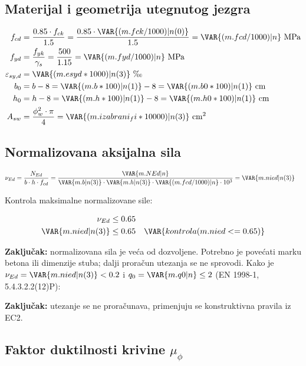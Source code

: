 \subsection{Materijal i geometrija utegnutog jezgra}

\begin{align*}
f_{cd} &= \frac{0.85 \cdot f_{ck}}{1.5} = \frac{0.85 \cdot \VAR{(m.fck/1000)|n(0)}}{1.5} = \VAR{(m.fcd/1000)|n} \ \mathrm{MPa} \\
f_{yd} &= \frac{f_{yk}}{\gamma_s} = \frac{500}{1.15} = \VAR{(m.fyd/1000)|n} \ \mathrm{MPa} \\
\varepsilon_{sy,d} &= \VAR{(m.esyd*1000)|n(3)} \ \text{‰} \\
b_0 &= b - 8 = \VAR{(m.b*100)|n(1)} - 8 = \VAR{(m.b0*100)|n(1)} \ \mathrm{cm} \\
h_0 &= h - 8 = \VAR{(m.h*100)|n(1)} - 8 = \VAR{(m.h0*100)|n(1)} \ \mathrm{cm} \\
A_{sw} &= \frac{\phi_w^2 \cdot \pi}{4} = \VAR{(m.izabrani_fi*10000)|n(3)} \ \mathrm{cm^2}
\end{align*}

\subsection{Normalizovana aksijalna sila}

\begin{align*}
\nu_{Ed} &= \frac{N_{Ed}}{b \cdot h \cdot f_{cd}} = \frac{\VAR{m.NEd|n}}{\VAR{m.b|n(3)} \cdot \VAR{m.h|n(3)} \cdot \VAR{(m.fcd/1000)|n} \cdot 10^3} = \VAR{m.nied|n(3)}
\end{align*}

Kontrola maksimalne normalizovane sile:

\begin{align*}
\nu_{Ed} &\leq 0.65 \\
\VAR{m.nied|n(3)} &\leq 0.65 \quad \VAR{kontrola(m.nied <= 0.65)}
\end{align*}

\textbf{Zaključak:} normalizovana sila je veća od dozvoljene. Potrebno je povećati marku betona ili dimenzije stuba; dalji proračun utezanja se ne sprovodi.
Kako je $\nu_{Ed} = \VAR{m.nied|n(3)} < 0.2$ i $q_0 = \VAR{m.q0|n} \leq 2$ (EN 1998-1, 5.4.3.2.2(12)P):

\textbf{Zaključak:} utezanje se ne proračunava, primenjuju se konstruktivna pravila iz EC2.

\subsection{Faktor duktilnosti krivine $\mu_\phi$}

